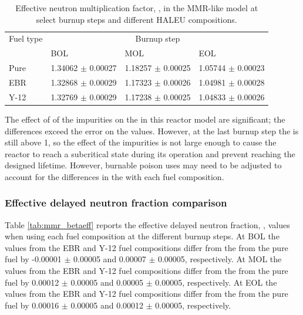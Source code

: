 \begin{table}[h!]
        \centering
        \caption{Effective neutron multiplication 
        factor, \keff, in the \gls*{MMR}-like model at select burnup 
        steps and different \gls*{HALEU} compositions.}
        \label{tab:mmr_keff}
        \begin{tabular}{l l l l}
                \hline 
                Fuel type & \multicolumn{3}{c}{Burnup step}\\
                & \gls*{BOL} & \gls*{MOL} & \gls*{EOL} \\
                \hline 
                Pure & 1.34062 $\pm$ 0.00027 & 1.18257 $\pm$ 0.00025 & 1.05744 $\pm$ 0.00023\\
                \gls*{EBR} & 1.32868 $\pm$ 0.00029 & 1.17323 $\pm$ 0.00026 & 1.04981 $\pm$ 0.00028 \\
                Y-12 & 1.32769 $\pm$ 0.00029 & 1.17238 $\pm$ 0.00025 & 1.04833 $\pm$ 0.00026\\
                \hline
                
        \end{tabular}
\end{table}

The effect of of the impurities on the \keff in this reactor 
model are significant; the differences exceed the error on the values. However, 
at the last burnup step the \keff is still above 1, so the 
effect of the impurities 
is not large enough to cause the reactor to reach a subcritical state 
during its operation and prevent reaching the designed 
lifetime. However, burnable poison uses may need 
to be adjusted to account for the differences in the \keff 
with each fuel composition.

\subsubsection{Effective delayed neutron fraction comparison}
Table \ref{tab:mmr_betaeff} reports the effective delayed 
neutron fraction, \betaEff, values when using 
each fuel composition at the different burnup steps. At \gls*{BOL} the 
\betaEff values from the \gls*{EBR} and Y-12 fuel compositions differ from 
the \betaEff from the pure fuel by -0.00001 $\pm$ 0.00005 and 0.00007 
$\pm$ 0.00005, respectively. At \gls*{MOL} the 
\betaEff values from the \gls*{EBR} and Y-12 fuel compositions differ from 
the \betaEff from the pure fuel by 0.00012 $\pm$ 0.00005 and 0.00005 
$\pm$ 0.00005, respectively. At \gls*{EOL} the 
\betaEff values from the \gls*{EBR} and Y-12 fuel compositions differ from 
the \betaEff from the pure fuel by 0.00016 $\pm$ 0.00005 and 0.00012 
$\pm$ 0.00005, respectively. 

